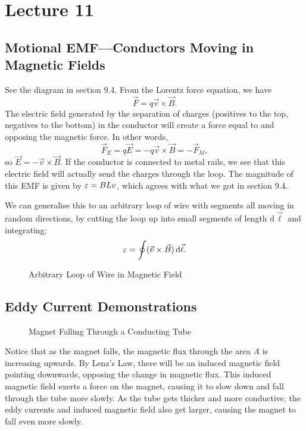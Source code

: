 \documentclass[class=article, crop=false]{standalone}
\begin{document}
  \section{Lecture 11}
  \subsection{Motional EMF---Conductors Moving in Magnetic Fields}
  See the diagram in section 9.4. From the Lorentz force equation, we have
  \[
    \vec{F} = q\vec{v}\times \vec{B}.
  \]
  The electric field generated by the separation of charges (positives to the top, negatives to the bottom) in the conductor will create a force equal to and opposing the magnetic force. In other words, 
  \[
    \vec{F}_E = q\vec{E} = -q\vec{v}\times \vec{B} = -\vec{F}_M,
  \]
  so $\vec{E} = -\vec{v}\times \vec{B}$. If the conductor is connected to metal rails, we see that this electric field will actually send the charges through the loop. The magnitude of this EMF is given by $\varepsilon = BLv$, which agrees with what we got in section 9.4. \par
  We can generalise this to an arbitrary loop of wire with segments all moving in random directions, by cutting the loop up into small segments of length $\mathrm{d}\vec{\ell}$ and integrating:
  \[
    \varepsilon = \oint (\vec{v}\times \vec{B})\,\mathrm{d}\vec{\ell}.
  \]
  \begin{figure}[ht]
    \centering
    \caption{Arbitrary Loop of Wire in Magnetic Field}
  \end{figure}
  \newpage
  \subsection{Eddy Current Demonstrations}
  \begin{figure}[ht]
    \centering
    \caption{Magnet Falling Through a Conducting Tube}
  \end{figure}
  Notice that as the magnet falls, the magnetic flux through the area $A$ is increasing upwards. By Lenz's Law, there will be an induced magnetic field pointing downwards, opposing the change in magnetic flux. This induced magnetic field exerts a force on the magnet, causing it to slow down and fall through the tube more slowly. As the tube gets thicker and more conductive, the eddy currents and induced magnetic field also get larger, causing the magnet to fall even more slowly.
\end{document}
